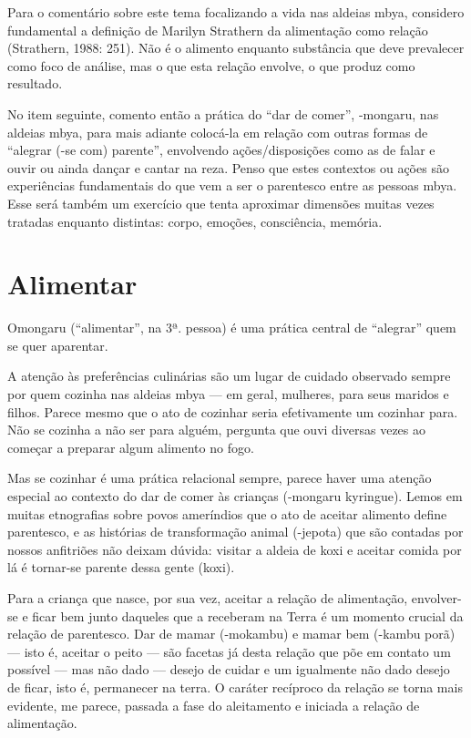 Para o comentário sobre este tema focalizando a vida nas aldeias mbya,
considero fundamental a definição de Marilyn Strathern da alimentação
como relação (Strathern, 1988: 251). Não é o alimento enquanto
substância que deve prevalecer como foco de análise, mas o que esta
relação envolve, o que produz como resultado.

No item seguinte, comento então a prática do ``dar de comer'', -mongaru,
nas aldeias mbya, para mais adiante colocá-la em relação com outras
formas de ``alegrar (-se com) parente'', envolvendo ações/disposições
como as de falar e ouvir ou ainda dançar e cantar na reza. Penso que
estes contextos ou ações são experiências fundamentais do que vem a ser
o parentesco entre as pessoas mbya. Esse será também um exercício que
tenta aproximar dimensões muitas vezes tratadas enquanto distintas:
corpo, emoções, consciência, memória.

\section{Alimentar}

Omongaru (``alimentar'', na 3ª. pessoa) é uma prática central de ``alegrar''
quem se quer aparentar.

A atenção às preferências culinárias são um lugar de cuidado observado
sempre por quem cozinha nas aldeias mbya — em geral, mulheres, para
seus maridos e filhos. Parece mesmo que o ato de cozinhar seria
efetivamente um cozinhar para. Não se cozinha a não ser para alguém,
pergunta que ouvi diversas vezes ao começar a preparar algum alimento
no fogo. 

Mas se cozinhar é uma prática relacional sempre, parece haver uma
atenção especial ao contexto do dar de comer às crianças (-mongaru
kyringue). Lemos em muitas etnografias sobre povos ameríndios que o ato
de aceitar alimento define parentesco, e as histórias de transformação
animal (-jepota) que são contadas por nossos anfitriões não deixam
dúvida: visitar a aldeia de koxi e aceitar comida por lá é tornar-se
parente dessa gente (koxi).

Para a criança que nasce, por sua vez, aceitar a relação de alimentação,
envolver-se e ficar bem junto daqueles que a receberam na Terra é um
momento crucial da relação de parentesco. Dar de mamar (-mokambu) e
mamar bem (-kambu porã) — isto é, aceitar o peito — são facetas já
desta relação que põe em contato um possível — mas não dado — desejo de
cuidar e um igualmente não dado desejo de ficar, isto é, permanecer na
terra. O caráter recíproco da relação se torna mais evidente, me
parece, passada a fase do aleitamento e iniciada a relação de
alimentação.

